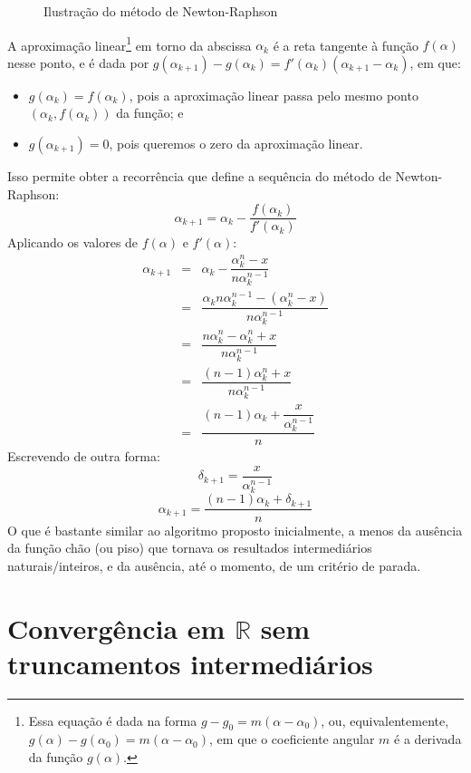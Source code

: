 \documentclass{article}
\begin{document}
\begin{figure}[H]
  \centering
  
  \caption{Ilustração do método de Newton-Raphson}
  \label{fig:newton-raphson}
\end{figure}

A aproximação linear\footnote{
  Essa equação é dada na forma $g - g_0 = m (\alpha - \alpha_0)$,
  ou, equivalentemente,
  $g(\alpha) - g(\alpha_0) = m (\alpha - \alpha_0)$,
  em que o coeficiente angular $m$ é a derivada da função $g(\alpha)$.
} em torno da abscissa $\alpha_k$
é a reta tangente à função $f(\alpha)$ nesse ponto,
e é dada por
$g(\alpha_{k+1}) - g(\alpha_k) =
 f'(\alpha_k) \left( \alpha_{k+1} - \alpha_k \right)$,
em que:
\begin{itemize}
  \item
  $g(\alpha_k) = f(\alpha_k)$, pois a aproximação linear
  passa pelo mesmo ponto $(\alpha_k, f(\alpha_k))$ da função; e
  \item
  $g(\alpha_{k+1}) = 0$,
  pois queremos o zero da aproximação linear.
\end{itemize}

Isso permite obter a recorrência
que define a sequência do método de Newton-Raphson:
\[\alpha_{k+1} = \alpha_k - \dfrac{f(\alpha_k)}{f'(\alpha_k)}\]
Aplicando os valores de $f(\alpha)$ e $f'(\alpha)$:
\[
  \begin{array}{rcl}
  \alpha_{k+1}
  &=& \alpha_k - \dfrac{\alpha_k^n - x}{n \alpha_k^{n-1}} \\[5mm]
  &=& \dfrac{\alpha_k n \alpha_k^{n-1}
    - (\alpha_k^n - x)}{n \alpha_k^{n-1}} \\[5mm]
  &=& \dfrac{n \alpha_k^n - \alpha_k^n + x}{n \alpha_k^{n-1}} \\[5mm]
  &=& \dfrac{(n-1) \alpha_k^n + x}{n \alpha_k^{n-1}} \\[5mm]
  &=& \dfrac{(n-1) \alpha_k + \dfrac{x}{\alpha_k^{n-1}}}{n}
  \end{array}
\]
Escrevendo de outra forma:
\[\delta_{k+1} = \dfrac{x}{\alpha_k^{n-1}}\]
\[\alpha_{k+1} = \dfrac{(n-1) \alpha_k + \delta_{k+1}}{n}\]
O que é bastante similar ao algoritmo proposto inicialmente,
a menos da ausência da função chão (ou piso)
que tornava os resultados intermediários naturais/inteiros,
e da ausência, até o momento, de um critério de parada.


\section*{Convergência em $\mathds{R}$ sem truncamentos intermediários}
\end{document}
